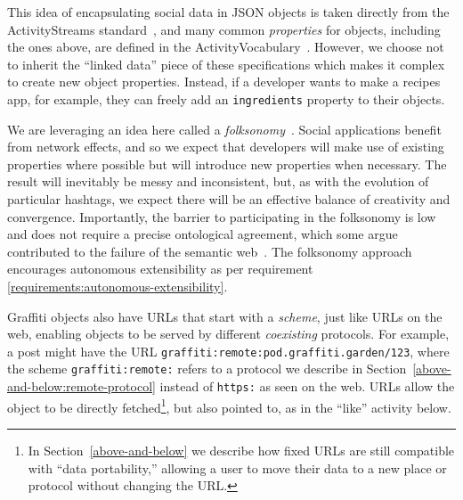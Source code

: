 This idea of encapsulating social data in JSON objects is
taken directly from the ActivityStreams standard~\cite{activitystreams},
and many common \emph{properties} for objects,
including the ones above, are defined in the
ActivityVocabulary~\cite{activityvocab}.
However, we choose not to inherit the ``linked data'' piece
of these specifications which makes it complex to create new object properties.
Instead, if a developer wants to make a recipes app, for example,
they can freely add an \texttt{ingredients} property to their objects.

We are leveraging an idea here called a \emph{folksonomy}~\cite{folksonomy}.
Social applications
benefit from network effects, and so we expect that developers will make use of
existing properties where possible
but will introduce new properties when necessary.
The result will inevitably be messy and inconsistent, but, as with the evolution of
particular hashtags, we expect there will be an effective balance of creativity and convergence.
Importantly, the barrier to participating in the folksonomy is low
and does not require a precise ontological agreement,
which some argue contributed to the failure of the semantic
web~\cite{semanticwebtwodecades}.
The folksonomy approach encourages autonomous extensibility
as per requirement \ref{requirements:autonomous-extensibility}.


Graffiti objects also have URLs that
start with a \emph{scheme}, just like URLs on the web,
enabling objects to be served by different \emph{coexisting} protocols.
For example, a post might have the URL
\texttt{graffiti\allowbreak:remote\allowbreak:pod\allowbreak.graffiti\allowbreak.garden\allowbreak/123},
where the scheme \texttt{graffiti:remote:} refers to a protocol we describe
in Section~\ref{above-and-below:remote-protocol}
instead of \texttt{https:} as seen on the web.
URLs allow the object to be directly fetched\footnote{
  In Section~\ref{above-and-below} we describe how fixed URLs
  are still compatible with ``data portability,'' allowing
  a user to move their data to a new place or protocol without
  changing the URL.
}, but also pointed to, as in the
``like'' activity below.

